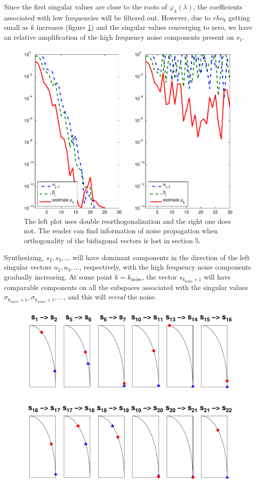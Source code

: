 \documentclass[11pt]{amsart}
\begin{document}
Since the first singular values are close to the roots of
$\varphi_{k}(\lambda)$, the coefficients associated with low frequencies will be
filtered out. However, due to $rho_{k}$ getting small as $k$ increases (figure
\ref{fig:rhok}) and the singular values converging to zero, we have an
relative amplification of the high frequency noise components present on 
$s_{1}$.
\begin{figure}[htb] \label{fig:rhok}
  \begin{center}
    \includegraphics[width=0.55\linewidth]{figures/run1/alpha_beta_est}
  \end{center}
\caption{The left plot uses double reorthogonalization and the right one does
not. The reader can find information of noise propagation when orthogonality of
the bidiagonal vectors is lost in \cite{bidiagonalization} section 5.}
\end{figure}

Synthesizing, $s_{2},s_{3},\ldots$ will have dominant components in the
direction of the left singular vectors $u_{2},u_{3},\ldots$, respectively, with
the high frequency noise components gradually increasing. At some point
$k = k_{\text{noise}}$, the vector $s_{k_{\text{noise}} + 1}$ will have
comparable components on all the subspaces associated with the singular values
$\sigma_{k_{noise} + 1}, \sigma_{k_{noise} + 1}, \ldots$, and this will 
\emph{reveal} the noise.

\begin{figure}[htb] \label{fig:snSpace}
  \begin{center}
    \includegraphics[width=0.55\linewidth]{figures/run1/signal_noise_space}
  \end{center}
\caption{}
\end{figure}
\end{document}
